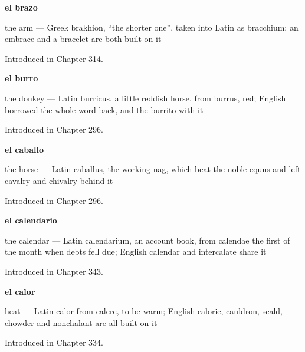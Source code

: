 \noindent\begin{minipage}[t]{\linewidth}
\raggedright
\textbf{el brazo}\par
\small the arm — Greek brakhion, \textquotedblleft{}the shorter one\textquotedblright{}, taken into Latin as bracchium; an embrace and a bracelet are both built on it\par
\footnotesize Introduced in Chapter 314.
\end{minipage}\par\medskip

\noindent\begin{minipage}[t]{\linewidth}
\raggedright
\textbf{el burro}\par
\small the donkey — Latin burricus, a little reddish horse, from burrus, red; English borrowed the whole word back, and the burrito with it\par
\footnotesize Introduced in Chapter 296.
\end{minipage}\par\medskip

\noindent\begin{minipage}[t]{\linewidth}
\raggedright
\textbf{el caballo}\par
\small the horse — Latin caballus, the working nag, which beat the noble equus and left cavalry and chivalry behind it\par
\footnotesize Introduced in Chapter 296.
\end{minipage}\par\medskip

\noindent\begin{minipage}[t]{\linewidth}
\raggedright
\textbf{el calendario}\par
\small the calendar — Latin calendarium, an account book, from calendae the first of the month when debts fell due; English calendar and intercalate share it\par
\footnotesize Introduced in Chapter 343.
\end{minipage}\par\medskip

\noindent\begin{minipage}[t]{\linewidth}
\raggedright
\textbf{el calor}\par
\small heat — Latin calor from calere, to be warm; English calorie, cauldron, scald, chowder and nonchalant are all built on it\par
\footnotesize Introduced in Chapter 334.
\end{minipage}\par\medskip

